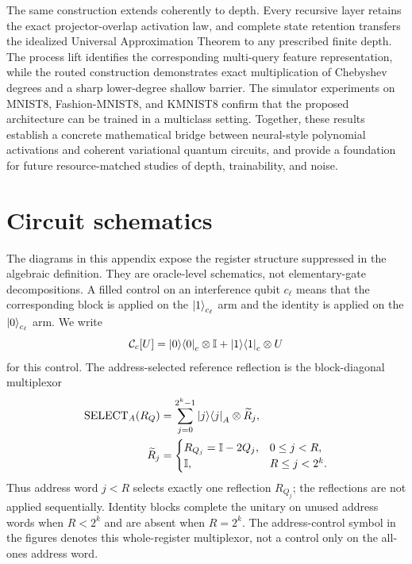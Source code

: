 \documentclass[pdflatex,sn-mathphys,NameDate,iicol]{sn-jnl}
\newcommand{\id}{\mathbb{I}}
\newcommand{\proj}[1]{\ket{#1}\!\bra{#1}}
\begin{document}
The same construction extends coherently to depth. Every recursive layer
retains the exact projector-overlap activation law, and complete state
retention transfers the idealized Universal Approximation Theorem to any
prescribed finite depth. The process lift identifies the corresponding
multi-query feature representation, while the routed construction demonstrates
exact multiplication of Chebyshev degrees and a sharp lower-degree shallow
barrier. The simulator experiments on MNIST8, Fashion-MNIST8, and KMNIST8
confirm that the proposed architecture can be trained in a multiclass setting.
Together, these results establish a concrete mathematical bridge between
neural-style polynomial activations and coherent variational quantum circuits,
and provide a foundation for future resource-matched studies of depth,
trainability, and noise.

\clearpage
\appendix
\section{Circuit schematics}
\label{app:circuits}

The diagrams in this appendix expose the register structure suppressed in the
algebraic definition. They are oracle-level schematics, not elementary-gate
decompositions. A filled control on an interference qubit $c_\ell$ means that
the corresponding block is applied on the $\ket{1}_{c_\ell}$ arm and the
identity is applied on the $\ket{0}_{c_\ell}$ arm. We write
\begin{equation}
 \mathcal C_c[U]
 =\proj{0}_c\otimes\id+\proj{1}_c\otimes U
 \label{eq:app-controlled-unitary}
\end{equation}
for this control. The address-selected reference reflection is the
block-diagonal multiplexor
\begin{equation}
\begin{aligned}
 \operatorname{SELECT}_{A}(R_Q)
 &=\sum_{j=0}^{2^k-1}\proj{j}_{A}\otimes\widetilde R_j,
 \\
 \widetilde R_j
 &=
 \begin{cases}
 R_{Q_j}=\id-2Q_j, & 0\le j<R,\\
 \id, & R\le j<2^k.
 \end{cases}
\end{aligned}
\label{eq:app-select-reflection}
\end{equation}
Thus address word $j<R$ selects exactly one reflection $R_{Q_j}$; the
reflections are not applied sequentially. Identity blocks complete the unitary
on unused address words when $R<2^k$ and are absent when $R=2^k$. The
address-control symbol in the figures denotes this whole-register multiplexor,
not a control only on the all-ones address word.
\end{document}
